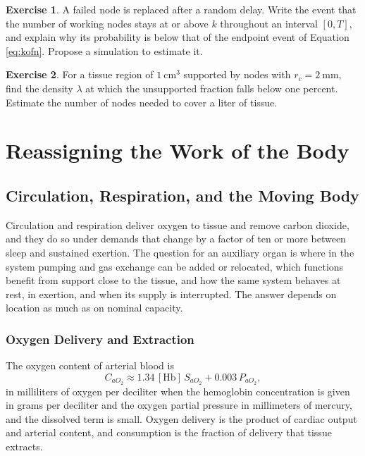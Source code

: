 \documentclass[11pt,openany]{book}
\theoremstyle{definition}
\newtheorem{exercise}{Exercise}[chapter]
\theoremstyle{remark}
\begin{document}
\begin{exercise}
A failed node is replaced after a random delay. Write the event that the number of working nodes stays at or above $k$ throughout an interval $[0,T]$, and explain why its probability is below that of the endpoint event of Equation \eqref{eq:kofn}. Propose a simulation to estimate it.
\end{exercise}

\begin{exercise}
For a tissue region of $1\ \mathrm{cm^3}$ supported by nodes with $r_c=2\ \mathrm{mm}$, find the density $\lambda$ at which the unsupported fraction falls below one percent. Estimate the number of nodes needed to cover a liter of tissue.
\end{exercise}

\part{Reassigning the Work of the Body}

\chapter{Circulation, Respiration, and the Moving Body}
\label{ch:circulation}

Circulation and respiration deliver oxygen to tissue and remove carbon dioxide, and they do so under demands that change by a factor of ten or more between sleep and sustained exertion. The question for an auxiliary organ is where in the system pumping and gas exchange can be added or relocated, which functions benefit from support close to the tissue, and how the same system behaves at rest, in exertion, and when its supply is interrupted. The answer depends on location as much as on nominal capacity.

\section{Oxygen Delivery and Extraction}

The oxygen content of arterial blood is
\begin{equation}
C_{aO_2}\approx1.34\,[\mathrm{Hb}]\,S_{aO_2}+0.003\,P_{aO_2},
\label{eq:cao2}
\end{equation}
in milliliters of oxygen per deciliter when the hemoglobin concentration is given in grams per deciliter and the oxygen partial pressure in millimeters of mercury, and the dissolved term is small. Oxygen delivery is the product of cardiac output and arterial content, and consumption is the fraction of delivery that tissue extracts.
\end{document}
